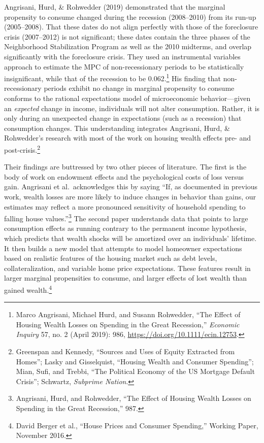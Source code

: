 \documentclass[12pt,oneside]{psthesis}
\begin{document}
Angrisani, Hurd, \& Rohwedder (2019) demonstrated that the marginal propensity to consume changed during the recession (2008--2010) from its run-up (2005--2008).
That these dates do not align perfectly with those of the foreclosure crisis (2007--2012) is not significant; these dates contain the three phases of the Neighborhood Stabilization Program as well as the 2010 midterms, and overlap significantly with the foreclosure crisis.
They used an instrumental variables approach to estimate the MPC of non-recessionary periods to be statistically insignificant, while that of the recession to be 0.062.\footnote{Marco Angrisani, Michael Hurd, and Susann Rohwedder, ``The Effect of Housing Wealth Losses on Spending in the Great Recession,'' \emph{Economic Inquiry} 57, no. 2 (April 2019): 986, \url{https://doi.org/10.1111/ecin.12753}.}
His finding that non-recessionary periods exhibit no change in marginal propensity to consume conforms to the rational expectations model of microeconomic behavior---given an \emph{expected} change in income, individuals will not alter consumption.
Rather, it is only during an unexpected change in expectations (such as a recession) that consumption changes.
This understanding integrates Angrisani, Hurd, \& Rohwedder's research with most of the work on housing wealth effects pre- and post-crisis.\footnote{Greenspan and Kennedy, ``Sources and Uses of Equity Extracted from Homes''; Lasky and Gisselquist, ``Housing Wealth and Consumer Spending''; Mian, Sufi, and Trebbi, ``The Political Economy of the US Mortgage Default Crisis''; Schwartz, \emph{Subprime Nation}.}

Their findings are buttressed by two other pieces of literature.
The first is the body of work on endowment effects and the psychological costs of loss versus gain.
Angrisani et al.~acknowledges this by saying ``If, as documented in previous work, wealth losses are more likely to induce changes in behavior than gains, our estimates may reflect a more pronounced sensitivity of household spending to falling house values.''\footnote{Angrisani, Hurd, and Rohwedder, ``The Effect of Housing Wealth Losses on Spending in the Great Recession,'' 987.}
The second paper understands data that points to large consumption effects as running contrary to the permanent income hypothesis, which predicts that wealth shocks will be amortized over an individuals' lifetime.
It then builds a new model that attempts to model homeowner expectations based on realistic features of the housing market such as debt levels, collateralization, and variable home price expectations.
These features result in larger marginal propensities to consume, and larger effects of lost wealth than gained wealth.\footnote{David Berger et al., ``House Prices and Consumer Spending,'' Working Paper, November 2016.}
\end{document}
